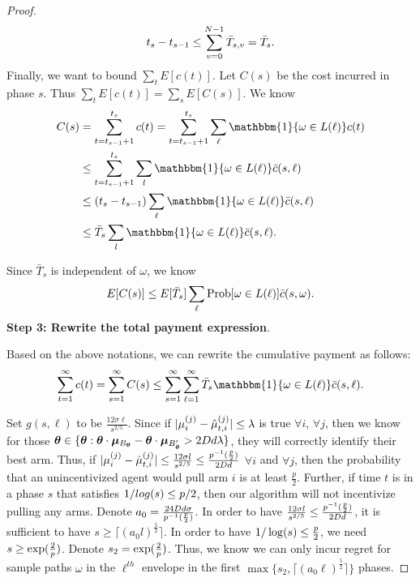 \begin{proof}
\begin{align}
t_{s}-t_{s-1}\leq \sum_{v=0}^{N-1}\bar{T}_{s,v}=\bar{T}_{s}.
\end{align}
Finally, we want to bound $\sum_{t}E[c(t)]$. Let $C(s)$ be the cost incurred in phase $s$. Thus $\sum_{t}E[c(t)]=\sum_{s}E[C(s)]$. We know
\begin{align}
C(s)&=\sum_{t=t_{s-1}+1}^{t_{s}}c(t)=\sum_{t=t_{s-1}+1}^{t_{s}}\sum_{\ell}\mathbbm{1}\{\omega\in L(\ell)\}c(t) \nonumber \\
&\leq \sum_{t=t_{s-1}+1}^{t_{s}}\sum_{l}\mathbbm{1}\{\omega\in L(\ell)\}\bar{c}(s,\ell) \nonumber \\
&\leq (t_{s}-t_{s-1})\sum_{\ell} \mathbbm{1}\{\omega\in L(\ell)\}\bar{c}(s,\ell) \nonumber \\
&\leq \bar{T}_{s}\sum_{l}\mathbbm{1}\{\omega\in L(\ell)\}\bar{c}(s,\ell). \nonumber
\end{align}

Since $\bar{T}_{s}$ is independent of $\omega$, we know
\begin{align}
E[C(s)]\leq E[\bar{T}_{s}]\sum_{\ell}\Prob{\omega\in L(\ell)}\bar{c}(s,\omega). \nonumber
\end{align}
\noindent\textbf{Step 3: Rewrite the total payment expression}.

Based on the above notations, we can rewrite the cumulative payment as follows:
\begin{align}
\sum_{t=1}^{\infty}c(t) =\sum_{s=1}^{\infty}C(s)
\leq  \sum_{s=1}^{\infty}\sum_{\ell=1}^{\infty}\bar{T}_{s}\mathbbm{1}\{\omega\in L(\ell)\}\bar{c}(s,\ell). \nonumber
\end{align}

Set $g(s,\ell)$ to be $\frac{12\sigma \ell}{s^{2/5}}$. Since if $|\mu_{i}^{(j)}-\hat{\mu}_{t,i}^{(j)}|\leq \lambda$ is true $\forall i$, $\forall j$, then we know for those $\bm{\theta}\in \{\bm{\theta}:\bm{\theta}\cdot \bm{\mu}_{B_{\bm{\theta}}}-\bm{\theta} \cdot \bm{\mu}_{B'_{\bm{\theta}}}> 2D d\lambda\}$, they will correctly identify their best arm. Thus, if $|\mu_{i}^{(j)}-\hat{\mu}_{t,i}^{(j)}|\leq \frac{12\sigma l}{s^{2/5}} \leq \frac{p^{-1}(\frac{p}{2})}{2D d}$ $\forall i$ and $\forall j$, then the probability that an unincentivized agent would pull arm $i$ is at least $\frac{p}{2}$. Further, if time $t$ is in a phase $s$ that satisfies $1/log(s)\leq p/2$, then our algorithm will not incentivize pulling any arms. Denote $a_0=\frac{24D d\sigma}{p^{-1}(\frac{p}{2})}$. In order to have $\frac{12\sigma l}{s^{2/5}}\leq \frac{p^{-1}(\frac{p}{2})}{2D d}$, it is sufficient to have $s\geq \lceil (a_{0} l)^\frac{5}{2} \rceil$. In order to have $1/\log(s)\leq \frac{p}{2}$, we need $s\geq \exp(\frac{2}{p})$. Denote $s_2=\exp(\frac{2}{p})$. Thus, we know we can only incur regret for sample paths $\omega$ in the $\ell^{th}$ envelope in the first $\max\{s_2,\lceil (a_0 \ell)^\frac{5}{2} \rceil\}$ phases.


\end{proof}
